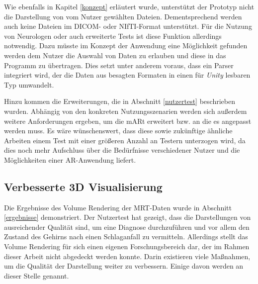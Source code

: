 Wie ebenfalls in Kapitel \ref{konzept} erläutert wurde, unterstützt der Prototyp nicht die Darstellung von vom Nutzer gewählten Dateien. Dementsprechend werden auch keine Dateien im DICOM- oder NIfTI-Format unterstützt. Für die Nutzung von Neurologen oder auch erweiterte Tests ist diese Funktion allerdings notwendig. Dazu müsste im Konzept der Anwendung eine Möglichkeit gefunden werden dem Nutzer die Auswahl von Daten zu erlauben und diese in das Programm zu übertragen. Dies setzt unter anderem voraus, dass ein Parser integriert wird, der die Daten aus besagten Formaten in einen für \textit{Unity} lesbaren Typ umwandelt. 

Hinzu kommen die Erweiterungen, die in Abschnitt \ref{nutzertest} beschrieben wurden. 
Abhängig von den konkreten Nutzungsszenarien werden sich außerdem weitere Anforderungen ergeben, um die mARt erweitert bzw. an die es angepasst werden muss. 
Es wäre wünschenswert, dass diese sowie zukünftige ähnliche Arbeiten einem Test mit einer größeren Anzahl an Testern unterzogen wird, da dies noch mehr Aufschluss über die Bedürfnisse verschiedener Nutzer und die Möglichkeiten einer AR-Anwendung liefert.

\subsection{Verbesserte 3D Visualisierung}

Die Ergebnisse des Volume Rendering der MRT-Daten wurde in Abschnitt \ref{ergebnisse} demonstriert. Der Nutzertest hat gezeigt, dass die Darstellungen von ausreichender Qualität sind, um eine Diagnose durchzuführen und vor allem den Zustand des Gehirns nach einen Schlaganfall zu vermitteln. 
Allerdings stellt das Volume Rendering für sich einen eigenen Forschungsbereich dar, der im Rahmen dieser Arbeit nicht abgedeckt werden konnte. Darin existieren viele Maßnahmen, um die Qualität der Darstellung weiter zu verbessern. Einige davon werden an dieser Stelle genannt. 

